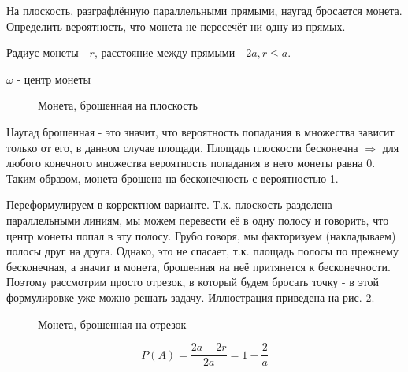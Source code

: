 \begin{exmp}
	На плоскость, разграфлённую параллельными прямыми, наугад бросается монета. Определить вероятность, что монета не пересечёт ни одну из прямых. 
	
	\noindent Радиус монеты - $r$, расстояние между прямыми - $2a, r \le a$.
	
	\noindent $\omega$ - центр монеты
	
	\begin{figure}[h]
		\caption{Монета, брошенная на плоскость}
		\label{img:monetaPar1}
	\end{figure}

	Наугад брошенная - это значит, что вероятность попадания в множества зависит только от его, в данном случае площади. Площадь плоскости бесконечна $\Rightarrow$ для любого конечного множества  вероятность попадания в него монеты равна 0. Таким образом, монета брошена на бесконечность с вероятностью 1.
	
	Переформулируем в корректном варианте. Т.к. плоскость разделена параллельными линиям, мы можем перевести её в одну полосу и говорить, что центр монеты попал в эту полосу. Грубо говоря, мы факторизуем (накладываем) полосы друг на друга. Однако, это не спасает, т.к. площадь полосы по прежнему бесконечная, а значит и монета, брошенная на неё притянется к бесконечности. Поэтому рассмотрим просто отрезок, в который будем бросать точку - в этой формулировке уже можно решать задачу. Иллюстрация приведена на рис. \ref{img:monetaPar2}.
	
	\begin{figure}[h]
		\caption{Монета, брошенная на отрезок}
		\label{img:monetaPar2}
	\end{figure}

	\[ P(A) = \dfrac{2a - 2r}{2a} = 1 - \dfrac{2}{a} \]
\end{exmp}

